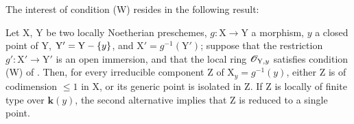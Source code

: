 The interest of condition (W) resides in the following result:
\begin{proposition}[21.12.10]
\label{IV.21.12.10}
Let $\mathrm{X}$, $\mathrm{Y}$ be two locally Noetherian preschemes, $g:\mathrm{X}\to\mathrm{Y}$ a morphism, $y$ a closed point of $\mathrm{Y}$, $\mathrm{Y}'=\mathrm{Y}-\{y\}$, and $\mathrm{X}'=g^{-1}(\mathrm{Y}')$; suppose that the restriction $g':\mathrm{X}'\to\mathrm{Y}'$ is an open immersion, and that the local ring $\mathscr{O}_{\mathrm{Y},y}$ satisfies condition \textup{(W)} of .
Then, for every irreducible component $\mathrm{Z}$ of $\mathrm{X}_y=g^{-1}(y)$, \textup{either} $\mathrm{Z}$ is of codimension $\leq 1$ in $\mathrm{X}$, \textup{or} its generic point is isolated in $\mathrm{Z}$.
If $\mathrm{Z}$ is locally of finite type over $\boldsymbol{k}(y)$, the second alternative implies that $\mathrm{Z}$ is reduced to a single point.
\end{proposition}

